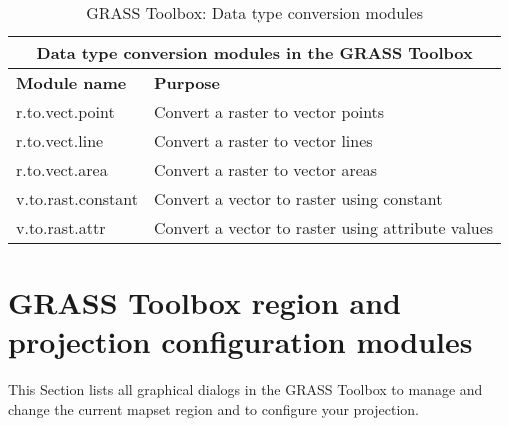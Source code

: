 \begin{table}[H]
\centering
 \begin{tabular}{|p{4cm}|p{10cm}|}
  \hline \multicolumn{2}{|c|}{\textbf{Data type conversion modules in the GRASS Toolbox}} \\
  \hline \textbf{Module name} & \textbf{Purpose} \\
  \hline r.to.vect.point & Convert a raster to vector points \\
  \hline r.to.vect.line & Convert a raster to vector lines \\
  \hline r.to.vect.area & Convert a raster to vector areas \\
  \hline v.to.rast.constant & Convert a vector to raster using constant \\
  \hline v.to.rast.attr & Convert a vector to raster using attribute values \\
\hline
\end{tabular}
 \caption{GRASS Toolbox: Data type conversion modules}
\end{table}


\section{GRASS Toolbox region and projection configuration modules}

This Section lists all graphical dialogs in the GRASS Toolbox to manage and
change the current mapset region and to configure your projection.

